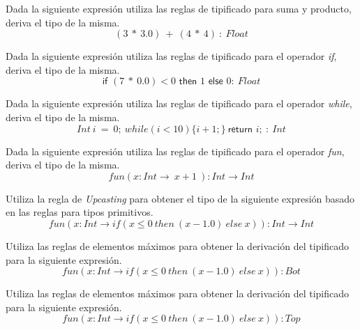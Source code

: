     \bigskip

    \begin{exercise}
        Dada la siguiente expresión utiliza las reglas de tipificado para suma y producto, deriva el tipo de la misma.
        $$ (3\ *\ 3.0)\ +\ (4\ *\ 4)\ : \ \textit{Float}$$
    \end{exercise}
    \bigskip

    \begin{exercise}
        Dada la siguiente expresión utiliza las reglas de tipificado para el operador \textit{if}, deriva el tipo de la misma.
        $$ \textsf{if } (7\ *\ 0.0) < 0 \textsf{ then } 1 \textsf{ else } 0 : \ \textit{Float}$$
    \end{exercise}
    \bigskip

    \begin{exercise}
        Dada la siguiente expresión utiliza las reglas de tipificado para el operador \textit{while}, deriva el tipo de la misma.
        $$ Int\ i\ =\ 0;\ while(i < 10)\{i + 1;\}\ \textsf{return } i;\ :\ Int$$
    \end{exercise}
    \bigskip

    \begin{exercise}
        Dada la siguiente expresión utiliza las reglas de tipificado para el operador \textit{fun}, deriva el tipo de la misma.
        $$ fun(x:\textit{Int} \rightarrow \ x + 1\ ) : \textit{Int}  \rightarrow \textit{Int} $$
    \end{exercise}

    \bigskip

    \begin{exercise}
        Utiliza la regla de \textit{Upcasting} para obtener el tipo de la siguiente expresión basado en las reglas para tipos primitivos.
        $$ fun(x:\textit{Int} \rightarrow if( x \leq 0\ then\ (x - 1.0) \ else\ x  ) ) : \textit{Int}  \rightarrow \textit{Int} $$
    \end{exercise}

    \bigskip

    \begin{exercise}
        Utiliza las reglas de elementos máximos para obtener la derivación del tipificado para la siguiente expresión.
        $$ fun(x:\textit{Int} \rightarrow if( x \leq 0\ then\ (x - 1.0) \ else\ x  ) ) : \textit{Bot} $$
    \end{exercise}
	
	\bigskip

    \begin{exercise}
        Utiliza las reglas de elementos máximos para obtener la derivación del tipificado para la siguiente expresión.
        $$ fun(x:\textit{Int} \rightarrow if( x \leq 0\ then\ (x - 1.0) \ else\ x  ) ) : \textit{Top} $$
    \end{exercise}
 